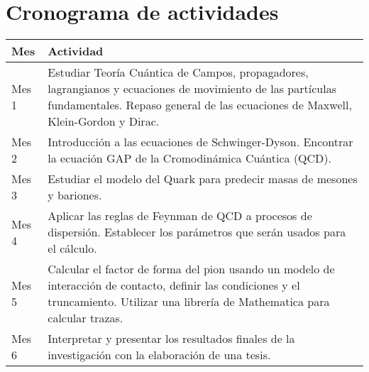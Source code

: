 \documentclass[12pt]{article}
\begin{document}
        \section{Cronograma de actividades}
        \begin{table}[h!] %
                \begin{tabular}{l|m{5in}}
                    \hline
                    Mes &
                    Actividad \\ \hline
                    Mes 1 &
                    Estudiar Teoría Cuántica de Campos, propagadores, lagrangianos y ecuaciones de movimiento de las partículas fundamentales. Repaso general de las ecuaciones de Maxwell, Klein-Gordon y Dirac. \\ \hline
                    Mes 2 & 
                    Introducción a las ecuaciones de Schwinger-Dyson. Encontrar la ecuación GAP de la Cromodinámica Cuántica (QCD).  \\ \hline
                    Mes 3 &
                    Estudiar el modelo del Quark para predecir masas de mesones y bariones.\\\hline
                    Mes 4 &
                    Aplicar las reglas de Feynman de QCD a procesos de dispersión. Establecer los parámetros que serán usados para el cálculo. \\ \hline
                    Mes 5 &
                    Calcular el factor de forma del pion usando un modelo de interacción de contacto, definir las condiciones y el truncamiento. Utilizar una librería de Mathematica para calcular trazas. \\ \hline
                    Mes 6 &
                    Interpretar y presentar los resultados finales de la investigación con la elaboración de una tesis. \\ \hline
            \end{tabular}
        \end{table}
    \newpage    
    
    
    
\end{document}
